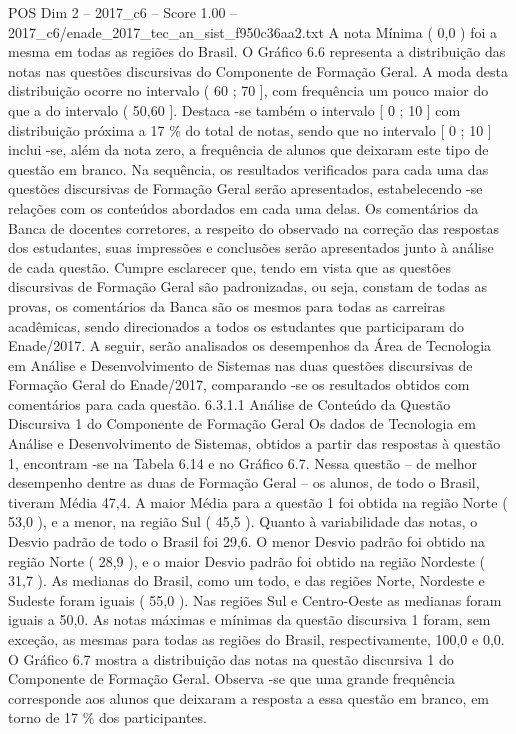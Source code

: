 \begin{textsample}{POS Dim 2 – 2017\_c6 – Score 1.00 – 2017\_c6/enade\_2017\_tec\_an\_sist\_f950c36aa2.txt}
A nota Mínima ( 0,0 ) foi a mesma em todas as regiões do Brasil.
O Gráfico 6.6 representa a distribuição das notas nas questões discursivas do Componente de Formação Geral.
A moda desta distribuição ocorre no intervalo ( 60 ; 70 ], com frequência um pouco maior do que a do intervalo ( 50,60 ].
Destaca -se também o intervalo [ 0 ; 10 ] com distribuição próxima a 17 \% do total de notas, sendo que no intervalo [ 0 ; 10 ] inclui -se, além da nota zero, a frequência de alunos que deixaram este tipo de questão em branco.
Na sequência, os resultados verificados para cada uma das questões discursivas de Formação Geral serão apresentados, estabelecendo -se relações com os conteúdos abordados em cada uma delas.
Os comentários da Banca de docentes corretores, a respeito do observado na correção das respostas dos estudantes, suas impressões e conclusões serão apresentados junto à análise de cada questão.
Cumpre esclarecer que, tendo em vista que as questões discursivas de Formação Geral são padronizadas, ou seja, constam de todas as provas, os comentários da Banca são os mesmos para todas as carreiras acadêmicas, sendo direcionados a todos os estudantes que participaram do Enade/2017.
A seguir, serão analisados os desempenhos da Área de Tecnologia em Análise e Desenvolvimento de Sistemas nas duas questões discursivas de Formação Geral do Enade/2017, comparando -se os resultados obtidos com comentários para cada questão. 6.3.1.1 Análise de Conteúdo da Questão Discursiva 1 do Componente de Formação Geral Os dados de Tecnologia em Análise e Desenvolvimento de Sistemas, obtidos a partir das respostas à questão 1, encontram -se na Tabela 6.14 e no Gráfico 6.7.
Nessa questão – de melhor desempenho dentre as duas de Formação Geral – os alunos, de todo o Brasil, tiveram Média 47,4.
A maior Média para a questão 1 foi obtida na região Norte ( 53,0 ), e a menor, na região Sul ( 45,5 ).
Quanto à variabilidade das notas, o Desvio padrão de todo o Brasil foi 29,6.
O menor Desvio padrão foi obtido na região Norte ( 28,9 ), e o maior Desvio padrão foi obtido na região Nordeste ( 31,7 ).
As medianas do Brasil, como um todo, e das regiões Norte, Nordeste e Sudeste foram iguais ( 55,0 ).
Nas regiões Sul e Centro-Oeste as medianas foram iguais a 50,0.
As notas máximas e mínimas da questão discursiva 1 foram, sem exceção, as mesmas para todas as regiões do Brasil, respectivamente, 100,0 e 0,0.
O Gráfico 6.7 mostra a distribuição das notas na questão discursiva 1 do Componente de Formação Geral.
Observa -se que uma grande frequência corresponde aos alunos que deixaram a resposta a essa questão em branco, em torno de 17 \% dos participantes.

\end{textsample}
